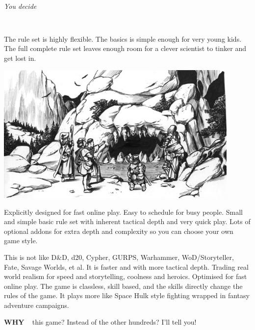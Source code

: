 \

\emph{You decide}

\

\noindent
The rule set is highly flexible. The basics is simple enough for very young kids. The full complete rule set leaves enough room for a clever scientist to tinker and get lost in.




\vfill

\begin{center}
\includegraphics[width=120mm]{./fig/cavemouth.jpg}
\end{center}

\vfill




\noindent
Explicitly designed for fast online play. Easy to schedule for busy people. Small and simple basic rule set with inherent tactical depth and very quick play. Lots of optional addons for extra depth and complexity so you can choose your own game style.

This is not like D\&D, d20, Cypher, GURPS, Warhammer, WoD/Storyteller, Fate, Savage Worlds, et al. It is faster and with more tactical depth. Trading real world realism for speed and storytelling, coolness and heroics. Optimised for fast online play. The game is classless, skill based, and the skills directly change the rules of the game. It plays more like Space Hulk style fighting wrapped in fantasy adventure campaigns.







\clearpage %

\noindent
\textbf{WHY} ~ this game? 
\hfill Instead of the other hundreds?  
\hfill I'll tell you!

\

